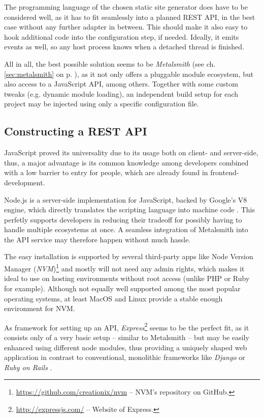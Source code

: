 The programming language of the chosen static site generator does have to be considered well, as it has to fit seamlessly into a planned REST API, in the best case without any further adapter in between. This should make it also easy to hook additional code into the configuration step, if needed. Ideally, it emits events as well, so any host process knows when a detached thread is finished.

All in all, the best possible solution seems to be \emph{Metalsmith} (see ch. \ref{sec:metalsmith} on p. \pageref{sec:metalsmith}), as it not only offers a pluggable module ecosystem, but also access to a JavaScript API, among others. Together with some custom tweaks (e.g. dynamic module loading), an independent build setup for each project may be injected using only a specific configuration file.


\subsection{Constructing a REST API}
\label{sec:primarythoughts-restapi}

JavaScript proved its universality due to its usage both on client- and server-side, thus, a major advantage is its common knowledge among developers combined with a low barrier to entry for people, which are already found in frontend-development.

Node.js is a server-side implementation for JavaScript, backed by Google's V8 engine, which directly translates the scripting language into machine code \cite[4]{cantelon2017node}. This perfetly supports developers in reducing their tradeoff for possibly having to handle multiple ecosystems at once. A seamless integration of Metalsmith into the API service may therefore happen without much hassle.

The easy installation is supported by several third-party apps like Node Version Manager (\emph{NVM})\footnote{\url{https://github.com/creationix/nvm} -- NVM's repository on GitHub.} and mostly will not need any admin rights, which makes it ideal to use on hosting environments without root access (unlike PHP or Ruby for example). Although not equally well supported among the most popular operating systems, at least MacOS and Linux provide a stable enough environment for NVM.

As framework for setting up an API, \emph{Express}\footnote{\url{http://expressjs.com/} -- Website of Express.} seems to be the perfect fit, as it consists only of a very basic setup -- similar to Metalsmith -- but may be easily enhanced using different node modules, thus providing a uniquely shaped web application in contrast to conventional, monolithic frameworks like \emph{Django} or \emph{Ruby on Rails} \cite[176]{cantelon2017node}.


